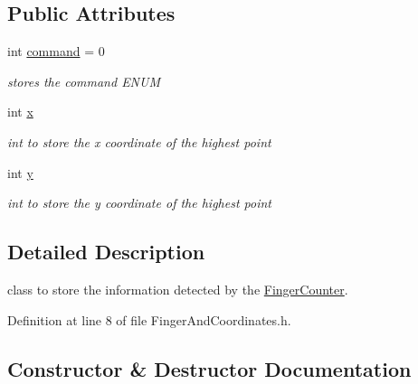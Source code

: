 \subsection*{Public Attributes}
\begin{DoxyCompactItemize}
\item 
int \hyperlink{class_gesture_detection_1_1_finger_and_coordinates_a1235facd3de69e4e6fd8a3326e140d18}{command} = 0
\begin{DoxyCompactList}\small\item\em stores the command E\+N\+UM \end{DoxyCompactList}\item 
int \hyperlink{class_gesture_detection_1_1_finger_and_coordinates_ad4442375646440085aafa4d366b2eb6b}{x}
\begin{DoxyCompactList}\small\item\em int to store the x coordinate of the highest point \end{DoxyCompactList}\item 
int \hyperlink{class_gesture_detection_1_1_finger_and_coordinates_a2e975227cf1ed24857600d35ee84e258}{y}
\begin{DoxyCompactList}\small\item\em int to store the y coordinate of the highest point \end{DoxyCompactList}\end{DoxyCompactItemize}


\subsection{Detailed Description}
class to store the information detected by the \hyperlink{class_gesture_detection_1_1_finger_counter}{Finger\+Counter}. 

Definition at line 8 of file Finger\+And\+Coordinates.\+h.



\subsection{Constructor \& Destructor Documentation}
\mbox{\label{class_gesture_detection_1_1_finger_and_coordinates_a9d24b8b3b3237f0a39762a52daf6f6a5}} 
